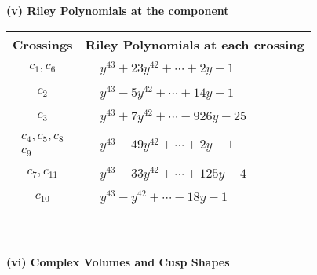 \documentclass[1p]{elsarticle_modified}
\theoremstyle{definition}
\begin{document}
\newpage\renewcommand{\arraystretch}{1}
\flushleft \textbf{(v) Riley Polynomials at the component}\newline \\
\begin{tabular}{m{50pt}|m{274pt}}
Crossings & \hspace{64pt}Riley Polynomials at each crossing \\
\hline $$\begin{aligned}c_{1},c_{6}\end{aligned}$$&$\begin{aligned}
&y^{43}+23 y^{42}+\cdots+2 y-1
\end{aligned}$\\
\hline $$\begin{aligned}c_{2}\end{aligned}$$&$\begin{aligned}
&y^{43}-5 y^{42}+\cdots+14 y-1
\end{aligned}$\\
\hline $$\begin{aligned}c_{3}\end{aligned}$$&$\begin{aligned}
&y^{43}+7 y^{42}+\cdots-926 y-25
\end{aligned}$\\
\hline $$\begin{aligned}c_{4},c_{5},c_{8}\\c_{9}\end{aligned}$$&$\begin{aligned}
&y^{43}-49 y^{42}+\cdots+2 y-1
\end{aligned}$\\
\hline $$\begin{aligned}c_{7},c_{11}\end{aligned}$$&$\begin{aligned}
&y^{43}-33 y^{42}+\cdots+125 y-4
\end{aligned}$\\
\hline $$\begin{aligned}c_{10}\end{aligned}$$&$\begin{aligned}
&y^{43}- y^{42}+\cdots-18 y-1
\end{aligned}$\\
\hline
\end{tabular}\\~\\
\newpage\flushleft \textbf{(vi) Complex Volumes and Cusp Shapes}
\end{document}
